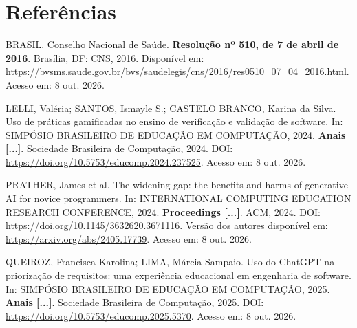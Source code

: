 \section*{\centering Referências}
\begin{singlespace}\setlength{\parindent}{0pt}\setlength{\parskip}{0.7em}
BRASIL. Conselho Nacional de Saúde. \textbf{Resolução nº 510, de 7 de abril de 2016}. Brasília, DF: CNS, 2016. Disponível em: \url{https://bvsms.saude.gov.br/bvs/saudelegis/cns/2016/res0510_07_04_2016.html}. Acesso em: 8 out. 2026.

LELLI, Valéria; SANTOS, Ismayle S.; CASTELO BRANCO, Karina da Silva. Uso de práticas gamificadas no ensino de verificação e validação de software. In: SIMPÓSIO BRASILEIRO DE EDUCAÇÃO EM COMPUTAÇÃO, 2024. \textbf{Anais [...]}. Sociedade Brasileira de Computação, 2024. DOI: \url{https://doi.org/10.5753/educomp.2024.237525}. Acesso em: 8 out. 2026.

PRATHER, James et al. The widening gap: the benefits and harms of generative AI for novice programmers. In: INTERNATIONAL COMPUTING EDUCATION RESEARCH CONFERENCE, 2024. \textbf{Proceedings [...]}. ACM, 2024. DOI: \url{https://doi.org/10.1145/3632620.3671116}. Versão dos autores disponível em: \url{https://arxiv.org/abs/2405.17739}. Acesso em: 8 out. 2026.

QUEIROZ, Francisca Karolina; LIMA, Márcia Sampaio. Uso do ChatGPT na priorização de requisitos: uma experiência educacional em engenharia de software. In: SIMPÓSIO BRASILEIRO DE EDUCAÇÃO EM COMPUTAÇÃO, 2025. \textbf{Anais [...]}. Sociedade Brasileira de Computação, 2025. DOI: \url{https://doi.org/10.5753/educomp.2025.5370}. Acesso em: 8 out. 2026.
\end{singlespace}
